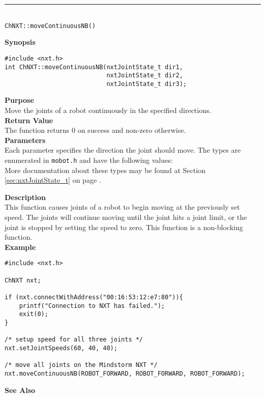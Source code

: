 \noindent
\vspace{5pt}
\rule{4.5in}{0.015in}\\
\noindent
{\LARGE \texttt{ChNXT::moveContinuousNB()} }\\


\noindent
{\bf Synopsis}
\vspace{-8pt}
\begin{verbatim}
#include <nxt.h>
int ChNXT::moveContinuousNB(nxtJointState_t dir1, 
                            nxtJointState_t dir2, 
                            nxtJointState_t dir3); 
\end{verbatim}

\noindent
{\bf Purpose}\\
Move the joints of a robot continuously in the specified directions.\\

\noindent
{\bf Return Value}\\
The function returns 0 on success and non-zero otherwise.\\

\noindent
{\bf Parameters}\\
Each parameter specifies the direction the joint should move. The types
are enumerated in \texttt{mobot.h} and have the following values:\\

\noindent
More documentation about these types may be found at Section
\ref{sec:nxtJointState_t} on page
\pageref{sec:nxtJointState_t}.

\noindent
{\bf Description}\\
This function causes joints of a robot to begin moving at the 
previously set speed. The joints will continue moving until the 
joint hits a joint limit, or the joint is stopped by setting the 
speed to zero. This function is a non-blocking function.\\

\noindent
{\bf Example}
\begin{verbatim}
#include <nxt.h> 

ChNXT nxt;

if (nxt.connectWithAddress("00:16:53:12:e7:80")){
    printf("Connection to NXT has failed.");
    exit(0);
}
 
/* setup speed for all three joints */
nxt.setJointSpeeds(60, 40, 40);

/* move all joints on the Mindstorm NXT */
nxt.moveContinuousNB(ROBOT_FORWARD, ROBOT_FORWARD, ROBOT_FORWARD);
\end{verbatim}

\noindent
{\bf See Also}\\
